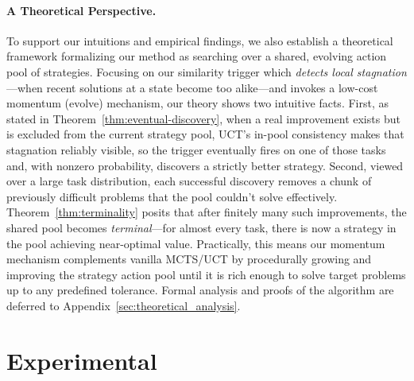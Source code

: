 \documentclass[11pt]{article}
\theoremstyle{definition}
\theoremstyle{remark}
\begin{document}
\paragraph{A Theoretical Perspective.}
To support our intuitions and empirical findings, 
we also establish a theoretical framework  formalizing our method as searching over a shared, evolving action pool of strategies. Focusing on our similarity trigger which \textit{detects local stagnation}—when recent solutions at a state become too alike—and invokes a low-cost momentum (evolve) mechanism, our theory shows two intuitive facts. 
First, as stated in Theorem~\ref{thm:eventual-discovery}, when a real improvement exists but is excluded from the current strategy pool, UCT’s in-pool consistency makes that stagnation reliably visible, so the trigger eventually fires on one of those tasks and, with nonzero probability, discovers a strictly better strategy. 
Second, viewed over a large task distribution, each successful discovery removes a chunk of previously difficult problems that the pool couldn’t solve effectively. Theorem~\ref{thm:terminality} posits that after finitely many such improvements, the shared pool becomes \textit{terminal}—for almost every task, there is now a strategy in the pool achieving near-optimal value. 
Practically, this means our momentum mechanism complements vanilla MCTS/UCT by procedurally growing and improving the strategy action pool until it is rich enough to solve target problems up to any predefined tolerance.
Formal analysis and proofs of the algorithm are deferred to Appendix~\ref{sec:theoretical_analysis}.

\section{Experimental}
\end{document}

